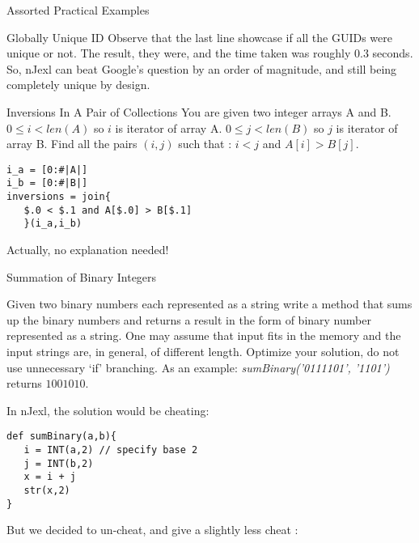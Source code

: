 \begin{section}{Assorted Practical Examples}
\begin{subsection}{Globally Unique ID}
Observe that the last line showcase if all the GUIDs were unique or not.
The result, they were, and the time taken was roughly $0.3$ seconds.
So, nJexl can beat Google's question by an order of magnitude, and still 
being completely unique by design.
\end{subsection}

\begin{subsection}{Inversions In A Pair of Collections}
You are given two integer arrays A and B. 
$0 \le i < len(A)$ so $i$ is iterator of array A.
$0 \le j < len(B)$ so $j$ is iterator of array B.
Find all the pairs $(i,j)$ such that : $i < j$ and $A[i] > B[j]$.

\begin{center}\begin{minipage}{\linewidth}
\begin{lstlisting}[style=JexlStyle]
i_a = [0:#|A|]
i_b = [0:#|B|]
inversions = join{
   $.0 < $.1 and A[$.0] > B[$.1]
   }(i_a,i_b)
\end{lstlisting}  
\end{minipage}\end{center}
Actually, no explanation needed!
\end{subsection}

\begin{subsection}{Summation of Binary Integers}

Given two binary numbers each represented as a string write a method that sums up the binary numbers 
and returns a result in the form of binary number represented as a string. 
One may assume that input fits in the memory and the input strings are, in general, of different length. 
Optimize your solution, do not use unnecessary `if' branching. 
As an example: \emph{sumBinary('0111101', '1101')} returns  $1001010$.

In nJexl, the solution would be cheating:
\begin{center}\begin{minipage}{\linewidth}
\begin{lstlisting}[style=JexlStyle]
def sumBinary(a,b){
   i = INT(a,2) // specify base 2 
   j = INT(b,2)
   x = i + j 
   str(x,2)
}
\end{lstlisting}  
\end{minipage}\end{center}

But we decided to un-cheat, and give a slightly less cheat :


\end{subsection}
\end{section}
